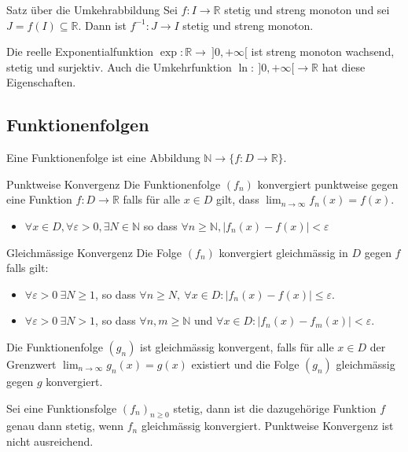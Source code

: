 \documentclass[a4paper,fontsize = 7pt]{scrartcl}
\def\limn{\lim_{n\to \infty}}
\def\R{\mathbb{R}}
\def\N{\mathbb{N}}
\begin{document}
\begin{mainbox}{Satz über die Umkehrabbildung}
  \vspace{-4pt}
 Sei $f: I \to \R$ stetig und streng monoton und sei $J = f(I) \subseteq \R$. Dann ist $f^{-1}: J \to I$ stetig und streng monoton.
 \vspace{-4pt}
\end{mainbox}

\begin{subbox}{Die reelle Exponentialfunktion}
  \vspace{-4pt}
  $\exp: \R \to \ ]0,+\infty[$ ist streng monoton wachsend, stetig und surjektiv. Auch die Umkehrfunktion $\ln: \ ]0,+\infty[ \to \R$ hat diese Eigenschaften.
  \vspace{-4pt}
\end{subbox}

\subsection{Funktionenfolgen}
Eine Funktionenfolge ist eine Abbildung $\N \to \{f: D \to \R \}$.
\begin{mainbox}{Punktweise Konvergenz}
  \vspace{-6pt}
  Die Funktionenfolge $(f_n)$ konvergiert punktweise gegen eine Funktion $f: D \to \R$ falls für alle $x \in D$ gilt, dass $\limn f_n(x) = f(x)$.
  \begin{itemize}
  \item $\forall x \in D, \forall \varepsilon>0, \exists N \in \N$ so dass $\forall n \geq \N, |f_n(x) -f(x)|<\varepsilon$
  \end{itemize}
  \vspace{-12pt}
\end{mainbox}

\begin{mainbox}{Gleichmässige Konvergenz}
  \vspace{-4pt}
 Die Folge $(f_n)$ konvergiert gleichmässig in $D$ gegen $f$ falls gilt:
 \begin{itemize}
  \item $\forall \varepsilon > 0 \ \exists N \ge 1$, so dass $\forall n \ge N, \ \forall x \in D: | f_n(x) - f(x) | \le \varepsilon$. 
  \item $\forall \varepsilon > 0 \ \exists N > 1$, so dass $\forall n, m \geq \N$ und $\forall x \in D: |f_n(x) - f_m(x)| < \varepsilon$.  
\end{itemize}
 Die Funktionenfolge $(g_n)$ ist gleichmässig konvergent, falls für alle $x\in D$ der Grenzwert $\limn g_n(x) = g(x)$ existiert und die Folge $(g_n)$ gleichmässig gegen $g$ konvergiert.
 \vspace{-12pt}
\end{mainbox}
Sei eine Funktionsfolge $(f_n)_{n \geq 0}$ stetig, dann ist die dazugehörige Funktion $f$ genau dann stetig, wenn $f_n$ gleichmässig konvergiert. Punktweise Konvergenz ist nicht ausreichend.
\end{document}
